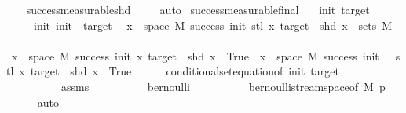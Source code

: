\begin{isabellebody}
%
\isadelimproof
\ \ %
\endisadelimproof
%
\isatagproof
{}\isamarkupfalse%
\ success{\isacharunderscore}{\kern0pt}measurable{\isacharunderscore}{\kern0pt}shd\ \isanewline
\ \ \isamarkupfalse%
\ auto%
\endisatagproof
{\isafoldproof}%
%
\isadelimproof
\isanewline
%
\endisadelimproof
\isanewline
\isanewline
\isanewline
{}\isamarkupfalse%
\ success{\isacharunderscore}{\kern0pt}measurable{\isacharunderscore}{\kern0pt}final{\isacharcolon}{\kern0pt}\isanewline
\ \ \ init\ target\isanewline
\ \ \ {\isachardoublequoteopen}{}\ {\isacharless}{\kern0pt}\ init{\isachardoublequoteclose}\ {\isachardoublequoteopen}init\ {\isacharless}{\kern0pt}\ target{\isachardoublequoteclose}\isanewline
\ \ x\ {\isasymin}\ space\ M{\isachardot}{\kern0pt}\ success\ {\isacharparenleft}{\kern0pt}init{\isacharplus}{\kern0pt}{}{\isacharparenright}{\kern0pt}\ {\isacharparenleft}{\kern0pt}stl\ x{\isacharparenright}{\kern0pt}\ target\ {\isasymand}\ shd\ x{\isacharbraceright}{\kern0pt}\ {\isasymin}\ sets\ M{\isachardoublequoteclose}\isanewline
%
\isadelimproof
%
\endisadelimproof
%
\isatagproof
{}\isamarkupfalse%
{\isacharminus}{\kern0pt}\isanewline
\ \ \isamarkupfalse%
\ {\isachardoublequoteopen}{\isacharbraceleft}{\kern0pt}x\ {\isasymin}\ space\ M{\isachardot}{\kern0pt}\ success\ init\ x\ target\ {\isasymand}\ shd\ x\ {\isacharequal}{\kern0pt}\ True{\isacharbraceright}{\kern0pt}\ {\isacharequal}{\kern0pt}\ {\isacharbraceleft}{\kern0pt}x\ {\isasymin}\ space\ M{\isachardot}{\kern0pt}\ success\ {\isacharparenleft}{\kern0pt}init\ {\isacharplus}{\kern0pt}\ {}{\isacharparenright}{\kern0pt}\ {\isacharparenleft}{\kern0pt}stl\ x{\isacharparenright}{\kern0pt}\ target\ {\isasymand}\ shd\ x\ {\isacharequal}{\kern0pt}\ True{\isacharbraceright}{\kern0pt}{\isachardoublequoteclose}\isanewline
\ \ \ \ \isamarkupfalse%
\ conditional{\isacharunderscore}{\kern0pt}set{\isacharunderscore}{\kern0pt}equation{\isacharbrackleft}{\kern0pt}of\ init\ target{\isacharbrackright}{\kern0pt}\isanewline
\ \ \ \ \ \ \ \ \ \ assms\isanewline
\ \ \ \ \ \ \ \ \ \ bernoulli\isanewline
\ \ \ \ \ \ \ \ \ \ bernoulli{\isacharunderscore}{\kern0pt}stream{\isacharunderscore}{\kern0pt}space{\isacharbrackleft}{\kern0pt}of\ M\ p{\isacharbrackright}{\kern0pt}\isanewline
\ \ \ \ \isamarkupfalse%
\ auto\isanewline
\ \ \isamarkupfalse%
\ \isamarkupfalse%

\end{isabellebody}
